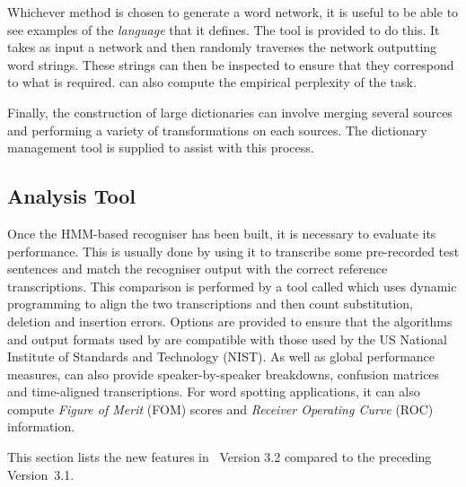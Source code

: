 Whichever method is chosen to generate a word network, it is useful
to be able to see examples of the \textit{language} that it defines.
The tool  is 
provided to do this.  It takes as input
a network and then randomly traverses the network outputting word
strings.  These strings can then be inspected to ensure that they
correspond to what is required.   can also compute
the empirical perplexity of the task.

Finally, the construction of large dictionaries can involve merging
several sources and performing a variety of transformations on each
sources.  The dictionary management 
tool  is supplied
to assist with this process.

\subsection{Analysis Tool}

Once the HMM-based recogniser has been built, it is necessary
to evaluate its performance.  This is usually done by using it
to transcribe some pre-recorded test sentences and match the
recogniser output with the correct reference transcriptions.
This comparison is performed by a tool called 
 which uses dynamic programming to align the two transcriptions
and then count substitution, deletion and insertion errors.
Options are provided to ensure that the
algorithms and output formats used 
by  are compatible
with those used by the US National Institute of Standards and Technology
(NIST).
As well as global performance measures,
 can also provide speaker-by-speaker breakdowns,
confusion matrices and time-aligned transcriptions.  For word spotting
applications, it can also compute \textit{Figure of Merit} (FOM) scores
and \textit{Receiver Operating Curve} (ROC) information.



This  section lists the new
features in \HTK\ Version 3.2 compared to the preceding Version~3.1.

